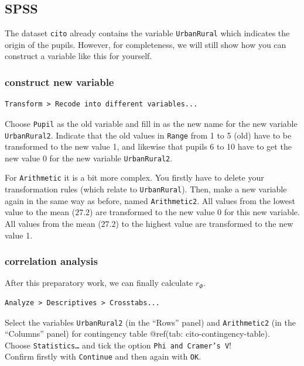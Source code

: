 \documentclass[
]{book}
\begin{document}
\subsection{SPSS}\label{spss-8}

The dataset \texttt{cito} already contains the variable \texttt{UrbanRural} which indicates the
origin of the pupils. However, for completeness, we will still show how you can
construct a variable like this for yourself.

\subsubsection{construct new variable}\label{construct-new-variable}

\begin{verbatim}
Transform > Recode into different variables...
\end{verbatim}

Choose \texttt{Pupil} as the old variable and fill in as the new name for the new variable
\texttt{UrbanRural2}. Indicate that the old values in \texttt{Range} from
1 to 5 (old) have to be transformed to the new value 1, and likewise that
pupils 6 to 10 have to get the new value 0 for the new variable
\texttt{UrbanRural2}.

For \texttt{Arithmetic} it is a bit more complex. You firstly have to delete
your transformation rules (which relate to \texttt{UrbanRural}). Then, make a new variable
again in the same way as before, named \texttt{Arithmetic2}.
All values from the lowest value to the mean (\(27.2\)) are transformed to the
new value 0 for this new variable. All values
from the mean (\(27.2\)) to the highest value are transformed to the new value 1.

\subsubsection{correlation analysis}\label{correlation-analysis}

After this preparatory work, we can finally calculate \(r_\Phi\).

\begin{verbatim}
Analyze > Descriptives > Crosstabs...
\end{verbatim}

Select the variables \texttt{UrbanRural2} (in the ``Rows'' panel) and \texttt{Arithmetic2}
(in the ``Columns'' panel) for
contingency table @ref(tab: cito-contingency-table).\\
Choose \texttt{Statistics…} and tick the option \texttt{Phi\ and\ Cramer’s\ V}!\\
Confirm firstly with \texttt{Continue} and then again with \texttt{OK}.
\end{document}
